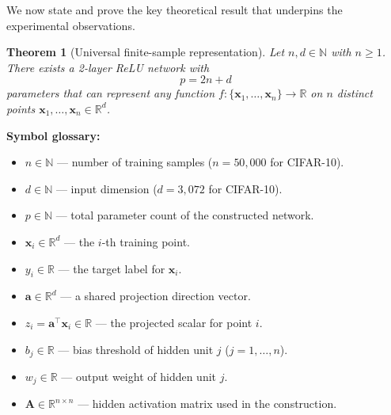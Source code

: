 \documentclass[12pt,a4paper]{article}
\newif\ifshowguides
\newcommand{\guide}[1]{%
  \ifshowguides
    \begin{tcolorbox}[colframe=blue!60,colback=blue!5,
                      title={\small\textbf{Instructor Guide}},
                      fonttitle=\small\bfseries]
      {\small\textit{Guide: }#1}
    \end{tcolorbox}
  \fi
}
\newtheorem{theorem}{Theorem}[section]
\theoremstyle{definition}
\theoremstyle{remark}
\begin{document}
\guide{%
  This subsection provides the formal theorem and proof sketch from
  Zhang et al.\ (2017). Ensure every symbol is defined before it is used.
  Walk through each step of the construction clearly. You may use the
  \texttt{proof} environment from \texttt{amsthm}.
}

We now state and prove the key theoretical result that underpins the
experimental observations.

\begin{theorem}[Universal finite-sample representation]
\label{thm:representation}
  Let $n, d \in \mathbb{N}$ with $n \geq 1$. There exists a 2-layer ReLU
  network with
  \begin{equation}
    p = 2n + d
    \label{eq:param_count}
  \end{equation}
  parameters that can represent \emph{any} function
  $f : \{\mathbf{x}_1, \ldots, \mathbf{x}_n\} \to \mathbb{R}$
  on $n$ distinct points $\mathbf{x}_1, \ldots, \mathbf{x}_n \in \mathbb{R}^d$.
\end{theorem}

\noindent
\textbf{Symbol glossary:}
\begin{itemize}
  \item $n \in \mathbb{N}$ --- number of training samples ($n = 50{,}000$ for CIFAR-10).
  \item $d \in \mathbb{N}$ --- input dimension ($d = 3{,}072$ for CIFAR-10).
  \item $p \in \mathbb{N}$ --- total parameter count of the constructed network.
  \item $\mathbf{x}_i \in \mathbb{R}^d$ --- the $i$-th training point.
  \item $y_i \in \mathbb{R}$ --- the target label for $\mathbf{x}_i$.
  \item $\mathbf{a} \in \mathbb{R}^d$ --- a shared projection direction vector.
  \item $z_i = \mathbf{a}^\top \mathbf{x}_i \in \mathbb{R}$ --- the projected scalar for point $i$.
  \item $b_j \in \mathbb{R}$ --- bias threshold of hidden unit $j$ ($j = 1,\ldots,n$).
  \item $w_j \in \mathbb{R}$ --- output weight of hidden unit $j$.
  \item $\mathbf{A} \in \mathbb{R}^{n \times n}$ --- hidden activation matrix used in the construction.
\end{itemize}
\end{document}

